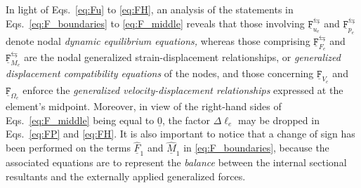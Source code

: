 \documentclass[12pt,a4paper,oneside,english]{abntex2} %
\newcommand{\vect}[1]{\underline{#1}}
\def\F{\vect{F}}
\def\Fhat{\widehat{\F}}
\def\M{\vect{M}}
\def\Mhat{\widehat{\M}}
\def\zv{\vect{0}}
\def\Deltal{\Delta \ell_e}
\def\Fu{\mathtt{\vect{F}}_{u_e}}
\def\Fump{\Fu^{\leftrightarrows}}
\def\Fp{\mathtt{\vect{F}}_{p_e}}
\def\Fpmp{\Fp^{\leftrightarrows}}
\def\FF{\mathtt{\vect{F}}_{F_e}}
\def\FFmp{\FF^{\leftrightarrows}}
\def\FM{\mathtt{\vect{F}}_{M_e}}
\def\FMmp{\FM^{\leftrightarrows}}
\def\FV{\mathtt{\vect{F}}_{V_e}}
\def\FO{\mathtt{\vect{F}}_{\Omega_e}}
\begin{document}
In light of Eqs.~\eqref{eq:Fu} to \eqref{eq:FH}, an analysis of the statements in Eqs.~\eqref{eq:F_boundaries} to \eqref{eq:F_middle} reveals that those involving $\Fump$ and $\Fpmp$ denote nodal \textit{dynamic equilibrium equations,} whereas those comprising $\FFmp$ and $\FMmp$ are the nodal generalized strain-displacement relationships, or \textit{generalized displacement compatibility equations} of the nodes, and those concerning $\FV$ and $\FO$ enforce the \textit{generalized velocity-displacement relationships} expressed at the element's midpoint. Moreover, in view of the right-hand sides of Eqs.~\eqref{eq:F_middle} being equal to $\zv$, the factor $\Deltal$ may be dropped in Eqs.~\eqref{eq:FP} and \eqref{eq:FH}. It is also important to notice that a change of sign has been performed on the terms $\Fhat_1$ and $\Mhat_1$ in \cref{eq:F_boundaries}, because the associated equations are to represent the \textit{balance} between the internal sectional resultants and the externally applied generalized forces.  
\end{document}
